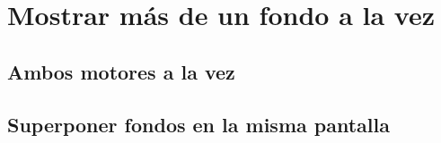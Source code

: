 \section{Mostrar más de un fondo a la vez}

\subsection{Ambos motores a la vez}

\subsection{Superponer fondos en la misma pantalla}





